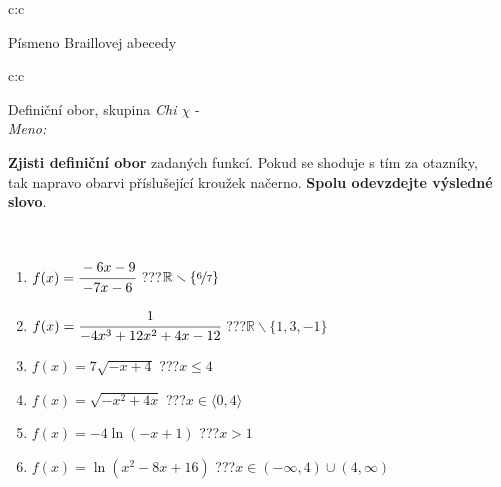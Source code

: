 \documentclass[10pt]{report}
\begin{document}
\begin{tabular}{c:c}
\begin{minipage}[c][104.5mm][t]{0.5\linewidth}
\begin{center}
\begin{minipage}{0.20\linewidth}
\begin{center}
{\small Písmeno Braillovej abecedy}
\end{center}
\end{minipage}
\end{center}
\end{minipage}
%
\end{tabular}
\newpage
\thispagestyle{empty}
\begin{tabular}{c:c}
\begin{minipage}[c][104.5mm][t]{0.5\linewidth}
\begin{center}
\vspace{7mm}
{\huge Definiční obor, skupina \textit{Chi $\chi$} -}\\[5mm]
\textit{Meno:}\phantom{xxxxxxxxxxxxxxxxxxxxxxxxxxxxxxxxxxxxxxxxxxxxxxxxxxxxxxxxxxxxxxxxx}\\[5mm]
\begin{minipage}{0.95\linewidth}
\textbf{Zjisti definiční obor} zadaných funkcí. Pokud se shoduje s tím za otazníky,\\tak napravo obarvi příslušející kroužek načerno. \textbf{Spolu odevzdejte výsledné slovo}.
\end{minipage}
\\[1mm]
\begin{minipage}{0.79\linewidth}
\begin{center}
\begin{varwidth}{\linewidth}
\begin{enumerate}
\normalsizerrr
\item $f(x)=\cfrac{-6x-9}{-7x-6}$\quad \dotfill\; ???\;\dotfill \quad $\mathbb{R}\smallsetminus\{\nicefrac{6}{7}\}$
\item $f(x)=\cfrac{1}{-4x^3+12x^2+4x-12}$\quad \dotfill\; ???\;\dotfill \quad $\mathbb{R}\smallsetminus\{1,3,-1\}$
\item $f(x)=7\sqrt{-x+4}$\quad \dotfill\; ???\;\dotfill \quad $x\leq4$
\item $f(x)=\sqrt{-x^2+4x}$\quad \dotfill\; ???\;\dotfill \quad $x\in\langle0 , 4\rangle$
\item $f(x)=-4\ln{(-x+1)}$\quad \dotfill\; ???\;\dotfill \quad $x>1$
\item $f(x)=\ln{(x^2-8x+16)}$\quad \dotfill\; ???\;\dotfill \quad $x\in(-\infty , 4)\cup(4 , \infty)$
\end{enumerate}
\end{varwidth}
\end{center}
\end{minipage}
\begin{minipage}{0.20\linewidth}

\end{minipage}
\end{center}
\end{minipage}
\end{tabular}
\end{document}
